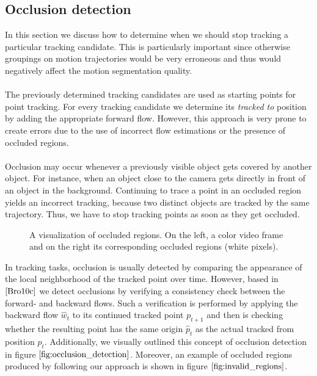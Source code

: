 \subsection{Occlusion detection}
\label{sec:occlusion_det}
In this section we discuss how to determine when we should stop tracking a particular tracking candidate. This is particularly important since otherwise groupings on motion trajectories would be very erroneous and thus would negatively affect the motion segmentation quality. \\ \\
The previously determined tracking candidates are used as starting points for point tracking. For every tracking candidate we determine its \textit{tracked to} position by adding the appropriate forward flow. However, this approach is very prone to create errors due to the use of incorrect flow estimations or the presence of occluded regions. \\ \\
Occlusion may occur whenever a previously visible object gets covered by another object. For instance, when an object close to the camera gets directly in front of an object in the background. Continuing to trace a point in an occluded region yields an incorrect tracking, because two distinct objects are tracked by the same trajectory. Thus, we have to stop tracking points as soon as they get occluded.
\begin{figure}[H]
\begin{center}
\end{center}
\caption[Occluded Regions]{A visualization of occluded regions. On the left, a color video frame and on the right its corresponding occluded regions (white pixels).}
\label{fig:invalid_regions}
\end{figure}
In tracking tasks, occlusion is usually detected by comparing the appearance of the local neighborhood of the tracked point over time. However, based in  $\cite{Bro10c}$ we detect occlusions by verifying a consistency check between the forward- and backward flows. Such a verification is performed by applying the backward flow $\hat{w}_t$ to its continued tracked point $p_{t+1}$ and then is checking whether the resulting point has the same origin $\hat{p}_t$ as the actual tracked from position $p_t$. Additionally, we visually outlined this concept of occlusion detection in figure $\ref{fig:occlusion_detection}$. Moreover, an example of occluded regions produced by following our approach is shown in figure $\ref{fig:invalid_regions}$.
